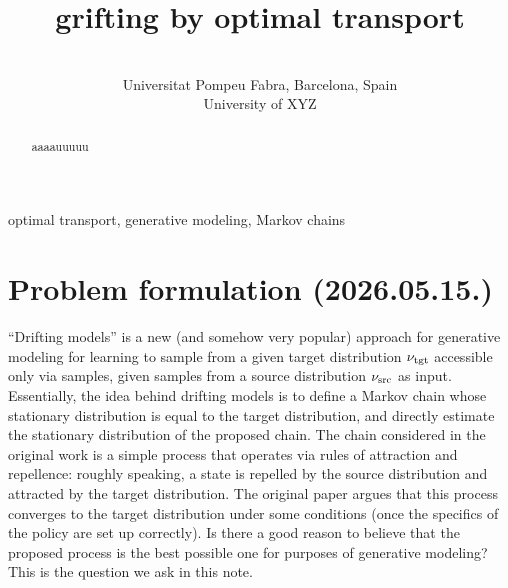 \documentclass[twoside,10pt]{jmlr}
\title{grifting by optimal transport}
\author{
 \Name[{Gergely~Neu}]{Gergely Neu} \Email{gergely.neu@gmail.com}\\
 \addr Universitat Pompeu Fabra, Barcelona, Spain
 \AND
 \Name{(add-your-name)} \Email{add-your-email@gmail.com}\\
 \addr University of XYZ
 }
\begin{document}
\maketitle

\begin{abstract}
aaaauuuuu
\end{abstract}

\begin{keywords}%
  optimal transport, generative modeling, Markov chains
\end{keywords}


\section{Problem formulation (2026.05.15.)}
``Drifting models'' is a new (and somehow very popular) approach for generative modeling for learning 
to sample from a given target distribution $\nu_{\text{tgt}}$ accessible only via samples, given samples from a source distribution 
$\nu_{\text{src}}$ as input. Essentially, the idea behind drifting models is to define a Markov chain whose stationary distribution 
is equal to the target distribution, and directly estimate the stationary distribution of the proposed chain. The chain 
considered in the original work is a simple process that operates via rules of attraction and repellence: roughly 
speaking, a state is repelled by the source distribution and attracted by the target distribution. The original paper 
argues that this process converges to the target distribution under some conditions (once the specifics of the policy 
are set up correctly). Is there a good reason to believe that the proposed process is the best possible one for 
purposes of generative modeling? This is the question we ask in this note.
\end{document}
